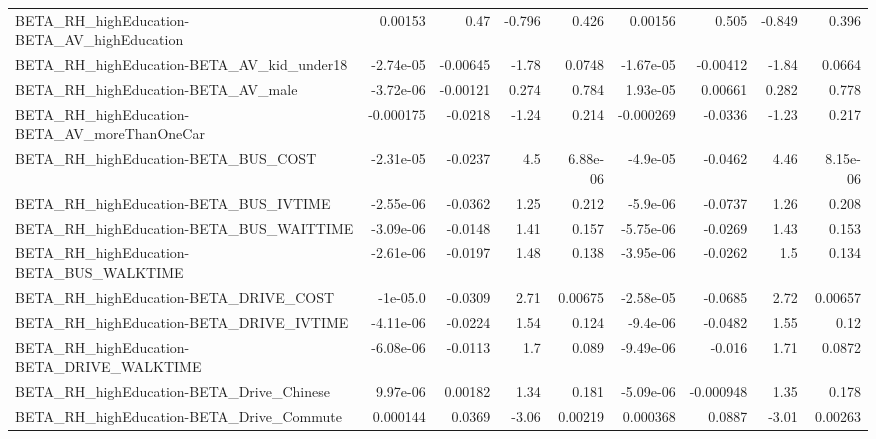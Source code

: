 \begin{tabular}{lrrrrrrrr}
BETA\_RH\_highEducation-BETA\_AV\_highEducation        &     0.00153 &         0.47 &   -0.796 &    0.426 &    0.00156 &       0.505 &       -0.849 &         0.396 \\
BETA\_RH\_highEducation-BETA\_AV\_kid\_under18          &   -2.74e-05 &     -0.00645 &    -1.78 &   0.0748 &  -1.67e-05 &    -0.00412 &        -1.84 &        0.0664 \\
BETA\_RH\_highEducation-BETA\_AV\_male                 &   -3.72e-06 &     -0.00121 &    0.274 &    0.784 &   1.93e-05 &     0.00661 &        0.282 &         0.778 \\
BETA\_RH\_highEducation-BETA\_AV\_moreThanOneCar       &   -0.000175 &      -0.0218 &    -1.24 &    0.214 &  -0.000269 &     -0.0336 &        -1.23 &         0.217 \\
BETA\_RH\_highEducation-BETA\_BUS\_COST                &   -2.31e-05 &      -0.0237 &      4.5 & 6.88e-06 &   -4.9e-05 &     -0.0462 &         4.46 &      8.15e-06 \\
BETA\_RH\_highEducation-BETA\_BUS\_IVTIME              &   -2.55e-06 &      -0.0362 &     1.25 &    0.212 &   -5.9e-06 &     -0.0737 &         1.26 &         0.208 \\
BETA\_RH\_highEducation-BETA\_BUS\_WAITTIME            &   -3.09e-06 &      -0.0148 &     1.41 &    0.157 &  -5.75e-06 &     -0.0269 &         1.43 &         0.153 \\
BETA\_RH\_highEducation-BETA\_BUS\_WALKTIME            &   -2.61e-06 &      -0.0197 &     1.48 &    0.138 &  -3.95e-06 &     -0.0262 &          1.5 &         0.134 \\
BETA\_RH\_highEducation-BETA\_DRIVE\_COST              &    -1e-05.0 &      -0.0309 &     2.71 &  0.00675 &  -2.58e-05 &     -0.0685 &         2.72 &       0.00657 \\
BETA\_RH\_highEducation-BETA\_DRIVE\_IVTIME            &   -4.11e-06 &      -0.0224 &     1.54 &    0.124 &   -9.4e-06 &     -0.0482 &         1.55 &          0.12 \\
BETA\_RH\_highEducation-BETA\_DRIVE\_WALKTIME          &   -6.08e-06 &      -0.0113 &      1.7 &    0.089 &  -9.49e-06 &      -0.016 &         1.71 &        0.0872 \\
BETA\_RH\_highEducation-BETA\_Drive\_Chinese           &    9.97e-06 &      0.00182 &     1.34 &    0.181 &  -5.09e-06 &   -0.000948 &         1.35 &         0.178 \\
BETA\_RH\_highEducation-BETA\_Drive\_Commute           &    0.000144 &       0.0369 &    -3.06 &  0.00219 &   0.000368 &      0.0887 &        -3.01 &       0.00263 \\

\end{tabular}
